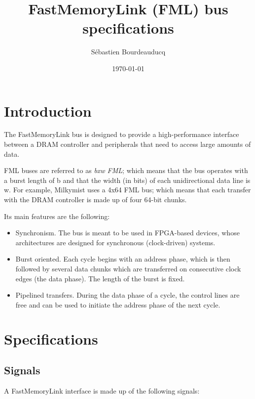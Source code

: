 \documentclass[a4paper,11pt]{article}
\title{FastMemoryLink (FML) bus specifications}
\author{S\'ebastien Bourdeauducq}
\date{\today}
\begin{document}
\setlength{\parindent}{0pt}
\setlength{\parskip}{5pt}
\maketitle{}

\section{Introduction}
The FastMemoryLink bus is designed to provide a high-performance interface between a DRAM controller and peripherals that need to access large amounts of data.

FML buses are referred to as \textit{bxw FML}; which means that the bus operates with a burst length of b and that the width (in bits) of each unidirectional data line is w. For example, Milkymist uses a 4x64 FML bus; which means that each transfer with the DRAM controller is made up of four 64-bit chunks.

Its main features are the following:
\begin{itemize}
\item Synchronism. The bus is meant to be used in FPGA-based devices, whose architectures are designed for synchronous (clock-driven) systems.
\item Burst oriented. Each cycle begins with an address phase, which is then followed by several data chunks  which are transferred on consecutive clock edges (the data phase). The length of the burst is fixed.
\item Pipelined transfers. During the data phase of a cycle, the control lines are free and can be used to initiate the address phase of the next cycle.
\end{itemize}

\section{Specifications}
\subsection{Signals}
A FastMemoryLink interface is made up of the following signals:
\end{document}
